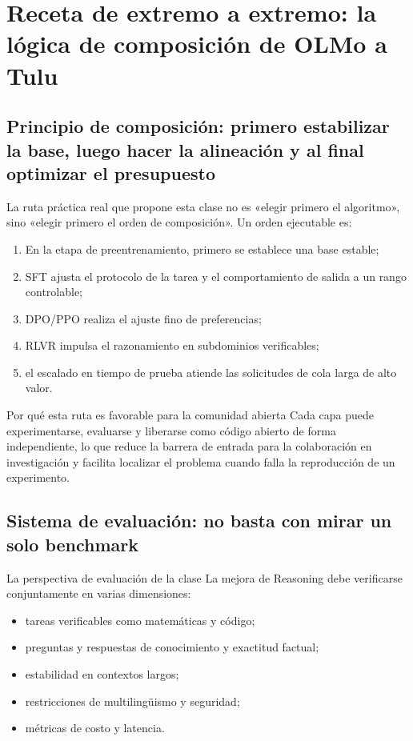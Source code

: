 \section{Receta de extremo a extremo: la lógica de composición de OLMo a Tulu}

\subsection{Principio de composición: primero estabilizar la base, luego hacer la alineación y al final optimizar el presupuesto}
La ruta práctica real que propone esta clase no es «elegir primero el algoritmo», sino «elegir primero el orden de composición». Un orden ejecutable es:
\begin{enumerate}
    \item En la etapa de preentrenamiento, primero se establece una base estable;
    \item SFT ajusta el protocolo de la tarea y el comportamiento de salida a un rango controlable;
    \item DPO/PPO realiza el ajuste fino de preferencias;
    \item RLVR impulsa el razonamiento en subdominios verificables;
    \item el escalado en tiempo de prueba atiende las solicitudes de cola larga de alto valor.
\end{enumerate}

\begin{knowledgebox}{Por qué esta ruta es favorable para la comunidad abierta}
Cada capa puede experimentarse, evaluarse y liberarse como código abierto de forma independiente, lo que reduce la barrera de entrada para la colaboración en investigación y facilita localizar el problema cuando falla la reproducción de un experimento.
\end{knowledgebox}

\subsection{Sistema de evaluación: no basta con mirar un solo benchmark}
\begin{importantbox}{La perspectiva de evaluación de la clase}
La mejora de Reasoning debe verificarse conjuntamente en varias dimensiones:
\begin{itemize}
    \item tareas verificables como matemáticas y código;
    \item preguntas y respuestas de conocimiento y exactitud factual;
    \item estabilidad en contextos largos;
    \item restricciones de multilingüismo y seguridad;
    \item métricas de costo y latencia.
\end{itemize}
\end{importantbox}

